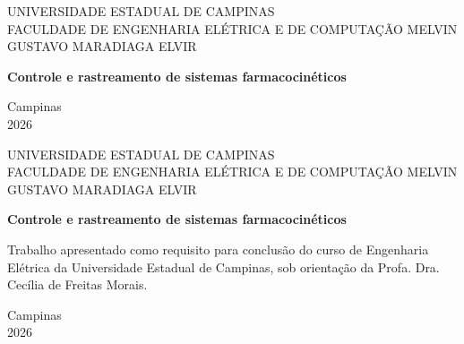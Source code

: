 \documentclass[12pt,a4paper]{article}
\begin{document}
\hypersetup{pageanchor=false}

\begin{titlepage}
\begin{center}
{\large UNIVERSIDADE ESTADUAL DE CAMPINAS}\\[0.25cm]
{\large FACULDADE DE ENGENHARIA ELÉTRICA E DE COMPUTAÇÃO}
\vfill
{\large MELVIN GUSTAVO MARADIAGA ELVIR}
\vfill
{\Large\bfseries Controle e rastreamento de sistemas farmacocinéticos\par}
\vspace{0.7cm}


\vfill
Campinas\\2026
\end{center}
\end{titlepage}


\begin{titlepage}
\begin{center}
{\large UNIVERSIDADE ESTADUAL DE CAMPINAS}\\[0.25cm]
{\large FACULDADE DE ENGENHARIA ELÉTRICA E DE COMPUTAÇÃO}
\vfill
{\large MELVIN GUSTAVO MARADIAGA ELVIR}
\vfill
{\Large\bfseries Controle e rastreamento de sistemas farmacocinéticos\par}
\vspace{1.5cm}
\end{center}
\hfill\begin{minipage}{0.55\textwidth}
Trabalho apresentado como requisito para conclusão do curso de Engenharia Elétrica da Universidade Estadual de Campinas, sob orientação da Profa. Dra. Cecília de Freitas Morais.
\end{minipage}
\vfill
\begin{center}Campinas\\2026\end{center}
\end{titlepage}




\cleardoublepage
{}
\tableofcontents
\clearpage
{}
\hypersetup{pageanchor=true}

 








\printbibliography[title={Referências}]
\end{document}
